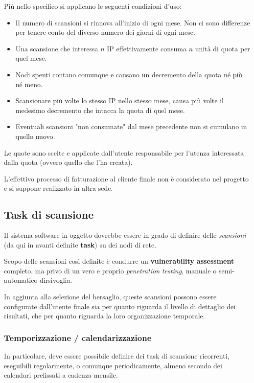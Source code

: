 Più nello specifico si applicano le seguenti condizioni d'uso:
\begin{itemize}
    \item Il numero di scansioni si rinnova all'inizio di ogni mese. Non ci sono differenze per tenere conto del diverso numero dei giorni di ogni mese.
    \item Una scansione che interessa $n$ IP effettivamente consuma $n$ unità di quota per quel mese.
    \item Nodi spenti contano comunque e causano un decremento della quota né più né meno.
    \item Scansionare più volte lo stesso IP nello stesso mese, causa più volte il medesimo decremento che intacca la quota di quel mese.
    \item Eventuali scansioni "non consumate" dal mese precedente non si cumulano in quello nuovo.
\end{itemize}

Le quote sono scelte e applicate dall'utente responsabile per l'utenza interessata dalla quota (ovvero quello che l'ha creata).

L'effettivo processo di fatturazione al cliente finale non è considerato nel progetto e si suppone realizzato in altra sede.

\subsection{Task di scansione}
Il sistema software in oggetto dovrebbe essere in grado di definire delle \emph{scansioni} (da qui in avanti definite \textbf{task}) su dei nodi di rete.

Scopo delle scansioni così definite è condurre un \textbf{vulnerability assessment} completo, ma privo di un vero e proprio \emph{penetration testing}, manuale o semi-automatico dirsivoglia.

In aggiunta alla selezione del bersaglio, queste scansioni possono essere configurate dall'utente finale sia per quanto riguarda il livello di dettaglio dei risultati, che per quanto riguarda la loro organizzazione temporale.

\subsubsection{Temporizzazione / calendarizzazione}
In particolare, deve essere possibile definire dei task di scansione ricorrenti, eseguibili regolarmente, o comunque periodicamente, almeno secondo dei calendari prefissati a cadenza mensile.

